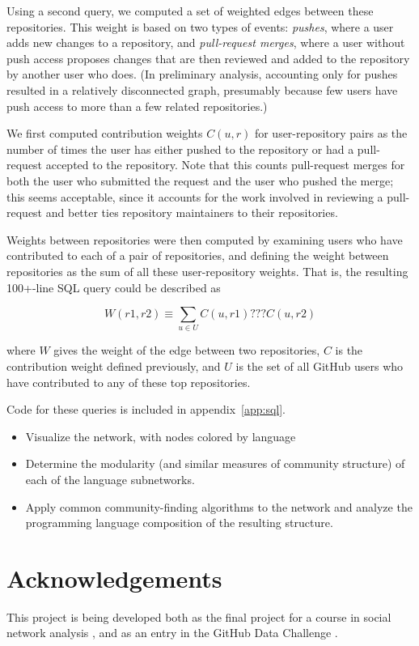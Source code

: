 \documentclass[twocolumn]{article}
\begin{document}
Using a second query, we computed a set of weighted edges between these
repositories. This weight is based on two types of events: \emph{pushes}, where
a user adds new changes to a repository, and \emph{pull-request merges}, where a
user without push access proposes changes that are then reviewed and added to
the repository by another user who does. (In preliminary analysis, accounting
only for pushes resulted in a relatively disconnected graph, presumably because
few users have push access to more than a few related repositories.)

We first computed contribution weights $C(u, r)$ for user-repository pairs as the
number of times the user has either pushed to the repository or had a
pull-request accepted to the repository. Note that this counts pull-request
merges for both the user who submitted the request and the user who pushed the
merge; this seems acceptable, since it accounts for the work involved in
reviewing a pull-request and better ties repository maintainers to their
repositories.

Weights between repositories were then computed by examining users who have
contributed to each of a pair of repositories, and defining the weight between
repositories as the sum of all these user-repository weights. That is, the
resulting 100+-line SQL query could be described as

\begin{equation}
    W(r1, r2) \equiv \sum_{u \in U} C(u, r1) ??? C(u, r2)
\end{equation}

where $W$ gives the weight of the edge between two repositories, $C$ is the
contribution weight defined previously, and $U$ is the set of all GitHub users
who have contributed to any of these top repositories.

Code for these queries is included in appendix~\ref{app:sql}.

\begin{itemize}
    \item Visualize the network, with nodes colored by language
    \item Determine the modularity (and similar measures of community structure)
        of each of the language subnetworks.
    \item Apply common community-finding algorithms to the network and analyze
        the programming language composition of the resulting structure.
\end{itemize}

\section{Acknowledgements}
This project is being developed both as the final project for a course in social
network analysis \cite{snacourse}, and as an entry in the GitHub Data Challenge
\cite{doll13}.
\end{document}
